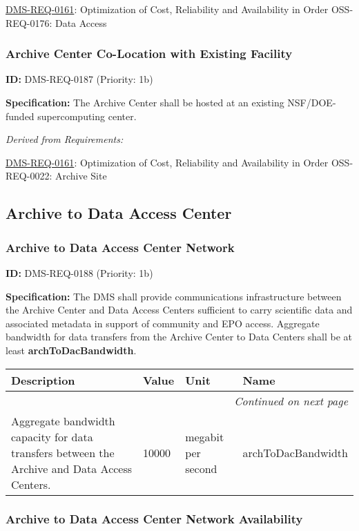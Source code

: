 \documentclass[SE,toc,lsstdraft]{lsstdoc}
\makeatletter
\newcommand{\paramname}[1]{\hspace{0pt}#1}
\newcommand{\unitname}[1]{\hspace{0pt}#1}
\newenvironment{parameters}[0]{%
\setlength\LTleft{0pt}
\setlength\LTright{\fill}
\begin{small}
\begin{longtable}[]{|p{0.49\textwidth}|l|p{0.6in}|p{1.70in}@{}|}

\hline \textbf{Description} & \textbf{Value} & \textbf{Unit} & \textbf{Name} \\ \hline
\endhead

\hline \multicolumn{4}{r}{\emph{Continued on next page}} \\
\endfoot

\hline\hline
\endlastfoot
}{%
\hline
\end{longtable}
\end{small}
}
\makeatother
\begin{document}
\hyperref[DMS-REQ-0161]{DMS-REQ-0161}:
Optimization of Cost, Reliability and Availability in Order \newline
OSS-REQ-0176:
Data Access \newline

\subsubsection{Archive Center Co-Location with Existing Facility}

\label{DMS-REQ-0187}
\textbf{ID:} DMS-REQ-0187 (Priority: 1b)

\textbf{Specification:} The Archive Center shall be hosted at an existing NSF/DOE-funded supercomputing center.

\emph{Derived from Requirements:}

\hyperref[DMS-REQ-0161]{DMS-REQ-0161}:
Optimization of Cost, Reliability and Availability in Order \newline
OSS-REQ-0022:
Archive Site \newline

\subsection{Archive to Data Access Center}

\subsubsection{Archive to Data Access Center Network}

\label{DMS-REQ-0188}
\textbf{ID:} DMS-REQ-0188 (Priority: 1b)

\textbf{Specification:} The DMS shall provide communications infrastructure between the Archive Center and Data Access Centers sufficient to carry scientific data and associated metadata in support of community and EPO access. Aggregate bandwidth for data transfers from the Archive Center to Data Centers shall be at least \textbf{archToDacBandwidth}.

\begin{parameters}
Aggregate bandwidth capacity for data transfers between the Archive and Data Access Centers.
&
10000
&
\unitname{%
megabit per second
}
&
\paramname{%
archToDacBandwidth
} \\\hline
\end{parameters}

\subsubsection{Archive to Data Access Center Network Availability}
\end{document}
